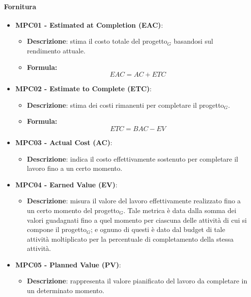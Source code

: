 \documentclass[10pt]{article}
\begin{document}
\begin{justify}
\paragraph{Fornitura}
\begin{itemize}
    \item \textbf{MPC01 - Estimated at Completion (EAC)}:
    \begin{itemize}
        \item   \textbf{Descrizione}: stima il costo totale del progetto$_G$ basandosi sul rendimento attuale.
        \item   \textbf{Formula:}
                \[
                EAC = AC + ETC
                \]
    \end{itemize}
    \item \textbf{MPC02 - Estimate to Complete (ETC)}:
    \begin{itemize}
        \item   \textbf{Descrizione}: stima dei costi rimanenti per completare il progetto$_G$.
        \item   \textbf{Formula:}
                \[
                ETC = BAC - EV
                \]
    \end{itemize}
    \item \textbf{MPC03 - Actual Cost (AC)}:
    \begin{itemize}
        \item \textbf{Descrizione}: indica il costo effettivamente sostenuto per completare il lavoro fino a un certo momento.
    \end{itemize}
    \item \textbf{MPC04 - Earned Value (EV)}:
        \begin{itemize}
            \item \textbf{Descrizione}: misura il valore del lavoro effettivamente realizzato fino a un certo momento del progetto$_G$. Tale metrica è data dalla somma
            dei valori guadagnati fino a quel momento per ciascuna delle attività di cui si compone il progetto$_G$; e ognuno di questi è dato dal budget di tale attività
            moltiplicato per la percentuale di completamento della stessa attività.
        \end{itemize}
    \item \textbf{MPC05 - Planned Value (PV)}:
        \begin{itemize}
            \item \textbf{Descrizione}: rappresenta il valore pianificato del lavoro da completare in un determinato momento.

\end{itemize}
\end{itemize}
\end{justify}
\end{document}
